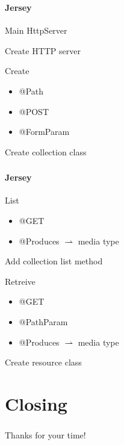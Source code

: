 \documentclass[handout]{beamer}
\begin{document}
\begin{frame}
	\frametitle{\insertsection}
	\framesubtitle{Jersey}
	\begin{block}{Main}
		HttpServer
	\end{block}
	\begin{semiverbatim}
		Create HTTP server
	\end{semiverbatim}
	\begin{block}{Create}
		\begin{itemize}
			\item @Path
			\item @POST
			\item @FormParam
		\end{itemize}
	\end{block}
	\begin{semiverbatim}
		Create collection class
	\end{semiverbatim}
\end{frame}

\begin{frame}
	\frametitle{\insertsection}
	\framesubtitle{Jersey}
	\begin{block}{List}
		\begin{itemize}
			\item @GET
			\item @Produces $\rightharpoonup$ media type
		\end{itemize}
	\end{block}
	\begin{semiverbatim}
		Add collection list method
	\end{semiverbatim}
	\begin{block}{Retreive}
		\begin{itemize}
			\item @GET
			\item @PathParam
			\item @Produces $\rightharpoonup$ media type
		\end{itemize}
	\end{block}
	\begin{semiverbatim}
		Create resource class
	\end{semiverbatim}
\end{frame}

\section*{Closing}
\begin{frame}
	\frametitle{\insertsection}
	Thanks for your time!
\end{frame}
\end{document}
